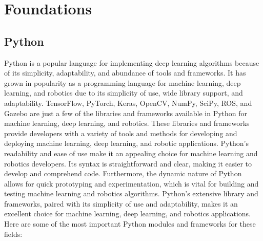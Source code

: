\documentclass[12pt,oneside]{article}
\begin{document}
\section{Foundations}\label{sec:grundlagen}
\subsection{Python}
Python is a popular language for implementing deep learning algorithms because of its simplicity, adaptability, and abundance of tools and frameworks. It has grown in popularity as a programming language for machine learning, deep learning, and robotics due to its simplicity of use, wide library support, and adaptability. TensorFlow, PyTorch, Keras, OpenCV, NumPy, SciPy, ROS, and Gazebo are just a few of the libraries and frameworks available in Python for machine learning, deep learning, and robotics. These libraries and frameworks provide developers with a variety of tools and methods for developing and deploying machine learning, deep learning, and robotic applications. Python's readability and ease of use make it an appealing choice for machine learning and robotics developers. Its syntax is straightforward and clear, making it easier to develop and comprehend code. Furthermore, the dynamic nature of Python allows for quick prototyping and experimentation, which is vital for building and testing machine learning and robotics algorithms. Python's extensive library and frameworks, paired with its simplicity of use and adaptability, makes it an excellent choice for machine learning, deep learning, and robotics applications. Here are some of the most important Python modules and frameworks for these fields:
\end{document}
